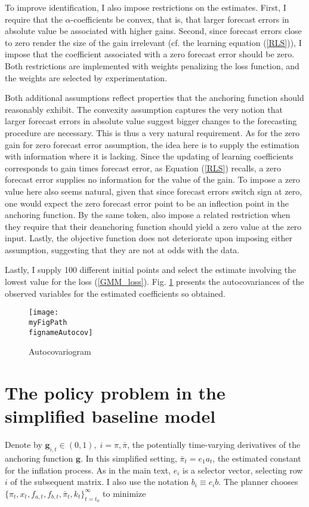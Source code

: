 \documentclass[11pt]{article}
\def \myFigPath {../../figures/}
\renewcommand{\[}{\begin{equation}}
\renewcommand{\]}{\end{equation}}
\def\fignameAutocov{autocovariogram_N_100_nfe_5_gridspacing_manual_Wdiffs2_100000_Wmid_1000_Nsimulations_command_sigmas_17_Sep_2020_12_05_56}
\begin{document}
To improve identification, I also impose restrictions on the estimates. First, I require that the $\alpha$-coefficients be convex, that is, that larger forecast errors in absolute value be associated with higher gains. Second, since forecast errors close to zero render the size of the gain irrelevant (cf. the learning equation (\ref{RLS})), I impose that the coefficient associated with a zero forecast error should be zero. Both restrictions are implemented with weights penalizing the loss function, and the weights are selected by experimentation. 

Both additional assumptions reflect properties that the anchoring function should reasonably exhibit. The convexity assumption captures the very notion that larger forecast errors in absolute value suggest bigger changes to the forecasting procedure are necessary. This is thus a very natural requirement. As for the zero gain for zero forecast error assumption, the idea here is to supply the estimation with information where it is lacking. Since the updating of learning coefficients corresponds to gain times forecast error, as Equation (\ref{RLS}) recalls, a zero forecast error supplies no information for the value of the gain. To impose a zero value here also seems natural, given that since forecast errors switch sign at zero, one would expect the zero forecast error point to be an inflection point in the anchoring function. By the same token, \cite{gobbi2019monetary} also impose a related restriction when they require that their deanchoring function should yield a zero value at the zero input. Lastly, the objective function does not deteriorate upon imposing either assumption, suggesting that they are not at odds with the data.

Lastly, I supply 100 different initial points and select the estimate involving the lowest value for the loss (\ref{GMM_loss}). Fig. \ref{autocovariogram} presents the autocovariances of the observed variables for the estimated coefficients so obtained.


\begin{figure}[h!]
\texttt{[image: \\myFigPath \\fignameAutocov]}
\caption{Autocovariogram}
\label{autocovariogram}
\end{figure}

\section{The policy problem in the simplified baseline model }\label{app_midsimple_problem}
Denote by $\mathbf{g}_{i,t} \in (0,1), \; i=\pi, \bar{\pi}$, the potentially time-varying derivatives of the anchoring function $\mathbf{g}$. In this simplified setting, $\bar{\pi}_t = e_1 a_t$, the estimated constant for the inflation process. As in the main text, $e_i$ is a selector vector, selecting row $i$ of the subsequent matrix. I also use the notation $b_i \equiv e_i b$.   The planner chooses $\{\pi_t, x_t, f_{a,t},  f_{b,t}, \bar{\pi}_t, k_t\}_{t=t_0}^{\infty}$ to minimize
\end{document}
